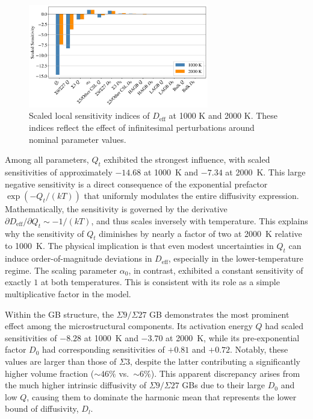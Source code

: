 \documentclass[%
preprint,
amsmath,amssymb,
aps,
]{revtex4-2}
\newcommand{\?}{\stackrel{?}{=}}
\begin{document}
\begin{figure}[h!]
 \centering
 \includegraphics[width=0.7\textwidth]{Sensitivity.png}
 \caption{Scaled local sensitivity indices of $D_ \text{eff}$ at 1000 K and 2000 K. These indices reflect the effect of infinitesimal perturbations around nominal parameter values.}
 \label{Fig:Sensitivity}
\end{figure}

Among all parameters, $Q_t$ exhibited the strongest influence, with scaled sensitivities of approximately $-14.68$ at 1000~K and $-7.34$ at 2000~K. This large negative sensitivity is a direct consequence of the exponential prefactor $\exp(-Q_t / (k T))$ that uniformly modulates the entire diffusivity expression. Mathematically, the sensitivity is governed by the derivative $\partial D_{\mathrm{eff}} / \partial Q_t \sim -1/(k T)$, and thus scales inversely with temperature. This explains why the sensitivity of $Q_t$ diminishes by nearly a factor of two at 2000~K relative to 1000~K. The physical implication is that even modest uncertainties in $Q_t$ can induce order-of-magnitude deviations in $D_\text{eff}$, especially in the lower-temperature regime. The scaling parameter $\alpha_0$, in contrast, exhibited a constant sensitivity of exactly $1$ at both temperatures. This is consistent with its role as a simple multiplicative factor in the model.

Within the GB structure, the $\Sigma 9/\Sigma 27$ GB demonstrates the most prominent effect among the microstructural components. Its activation energy $Q$ had scaled sensitivities of $-8.28$ at 1000~K and $-3.70$ at 2000~K, while its pre-exponential factor $D_0$ had corresponding sensitivities of $+0.81$ and $+0.72$. Notably, these values are larger than those of $\Sigma 3$, despite the latter contributing a significantly higher volume fraction ($\sim 46\%$ vs.\ $\sim 6\%$). This apparent discrepancy arises from the much higher intrinsic diffusivity of $\Sigma 9/\Sigma 27$ GBs due to their large $D_0$ and low $Q$, causing them to dominate the harmonic mean that represents the lower bound of diffusivity, $D_l$.
\end{document}
